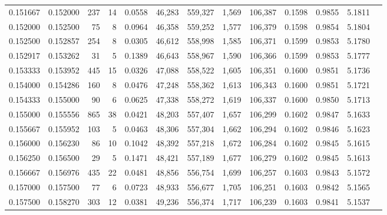 \begin{tabular}{rrrrrrrrrrrrr}
0.151667 & 0.152000 &   237 &  14 &                                     0.0558 &  46,283 & 559,327 &   1,569 & 106,387 & 0.1598 & 0.9855 & 5.1811 \\
0.152000 & 0.152500 &    75 &   8 &                                     0.0964 &  46,358 & 559,252 &   1,577 & 106,379 & 0.1598 & 0.9854 & 5.1804 \\
0.152500 & 0.152857 &   254 &   8 &                                     0.0305 &  46,612 & 558,998 &   1,585 & 106,371 & 0.1599 & 0.9853 & 5.1780 \\
0.152917 & 0.153262 &    31 &   5 &                                     0.1389 &  46,643 & 558,967 &   1,590 & 106,366 & 0.1599 & 0.9853 & 5.1777 \\
0.153333 & 0.153952 &   445 &  15 &                                     0.0326 &  47,088 & 558,522 &   1,605 & 106,351 & 0.1600 & 0.9851 & 5.1736 \\
0.154000 & 0.154286 &   160 &   8 &                                     0.0476 &  47,248 & 558,362 &   1,613 & 106,343 & 0.1600 & 0.9851 & 5.1721 \\
0.154333 & 0.155000 &    90 &   6 &                                     0.0625 &  47,338 & 558,272 &   1,619 & 106,337 & 0.1600 & 0.9850 & 5.1713 \\
0.155000 & 0.155556 &   865 &  38 &                                     0.0421 &  48,203 & 557,407 &   1,657 & 106,299 & 0.1602 & 0.9847 & 5.1633 \\
0.155667 & 0.155952 &   103 &   5 &                                     0.0463 &  48,306 & 557,304 &   1,662 & 106,294 & 0.1602 & 0.9846 & 5.1623 \\
0.156000 & 0.156230 &    86 &  10 &                                     0.1042 &  48,392 & 557,218 &   1,672 & 106,284 & 0.1602 & 0.9845 & 5.1615 \\
0.156250 & 0.156500 &    29 &   5 &                                     0.1471 &  48,421 & 557,189 &   1,677 & 106,279 & 0.1602 & 0.9845 & 5.1613 \\
0.156667 & 0.156976 &   435 &  22 &                                     0.0481 &  48,856 & 556,754 &   1,699 & 106,257 & 0.1603 & 0.9843 & 5.1572 \\
0.157000 & 0.157500 &    77 &   6 &                                     0.0723 &  48,933 & 556,677 &   1,705 & 106,251 & 0.1603 & 0.9842 & 5.1565 \\
0.157500 & 0.158270 &   303 &  12 &                                     0.0381 &  49,236 & 556,374 &   1,717 & 106,239 & 0.1603 & 0.9841 & 5.1537 \\

\end{tabular}
